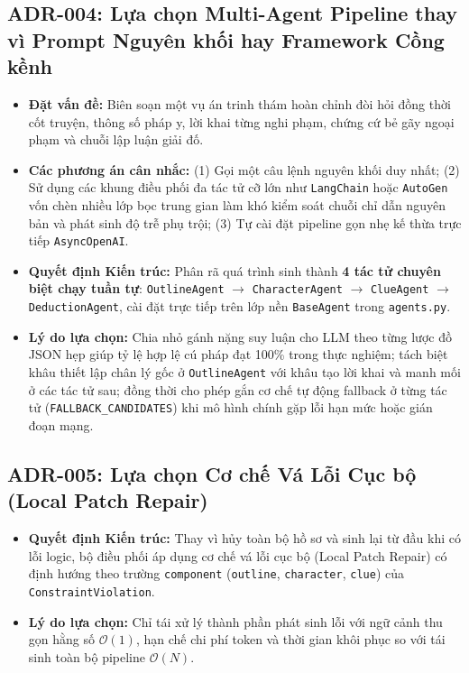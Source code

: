 \subsection{ADR-004: Lựa chọn Multi-Agent Pipeline thay vì Prompt Nguyên khối hay Framework Cồng kềnh}
\begin{itemize}[leftmargin=1.5cm]
    \item \textbf{Đặt vấn đề:} Biên soạn một vụ án trinh thám hoàn chỉnh đòi hỏi đồng thời cốt truyện, thông số pháp y, lời khai từng nghi phạm, chứng cứ bẻ gãy ngoại phạm và chuỗi lập luận giải đố.
    \item \textbf{Các phương án cân nhắc:} (1) Gọi một câu lệnh nguyên khối duy nhất; (2) Sử dụng các khung điều phối đa tác tử cỡ lớn như \texttt{LangChain} hoặc \texttt{AutoGen} vốn chèn nhiều lớp bọc trung gian làm khó kiểm soát chuỗi chỉ dẫn nguyên bản và phát sinh độ trễ phụ trội; (3) Tự cài đặt pipeline gọn nhẹ kế thừa trực tiếp \texttt{AsyncOpenAI}.
    \item \textbf{Quyết định Kiến trúc:} Phân rã quá trình sinh thành \textbf{4 tác tử chuyên biệt chạy tuần tự}: \texttt{OutlineAgent} $\to$ \texttt{CharacterAgent} $\to$ \texttt{ClueAgent} $\to$ \texttt{DeductionAgent}, cài đặt trực tiếp trên lớp nền \texttt{BaseAgent} trong \texttt{agents.py}.
    \item \textbf{Lý do lựa chọn:} Chia nhỏ gánh nặng suy luận cho LLM theo từng lược đồ JSON hẹp giúp tỷ lệ hợp lệ cú pháp đạt 100\% trong thực nghiệm; tách biệt khâu thiết lập chân lý gốc ở \texttt{OutlineAgent} với khâu tạo lời khai và manh mối ở các tác tử sau; đồng thời cho phép gắn cơ chế tự động fallback ở từng tác tử (\texttt{FALLBACK\_CANDIDATES}) khi mô hình chính gặp lỗi hạn mức hoặc gián đoạn mạng.
\end{itemize}

\subsection{ADR-005: Lựa chọn Cơ chế Vá Lỗi Cục bộ (Local Patch Repair)}
\begin{itemize}[leftmargin=1.5cm]
    \item \textbf{Quyết định Kiến trúc:} Thay vì hủy toàn bộ hồ sơ và sinh lại từ đầu khi có lỗi logic, bộ điều phối áp dụng cơ chế vá lỗi cục bộ (Local Patch Repair) có định hướng theo trường \texttt{component} (\texttt{outline}, \texttt{character}, \texttt{clue}) của \texttt{ConstraintViolation}.
    \item \textbf{Lý do lựa chọn:} Chỉ tái xử lý thành phần phát sinh lỗi với ngữ cảnh thu gọn hằng số $\mathcal{O}(1)$, hạn chế chi phí token và thời gian khôi phục so với tái sinh toàn bộ pipeline $\mathcal{O}(N)$.
\end{itemize}

